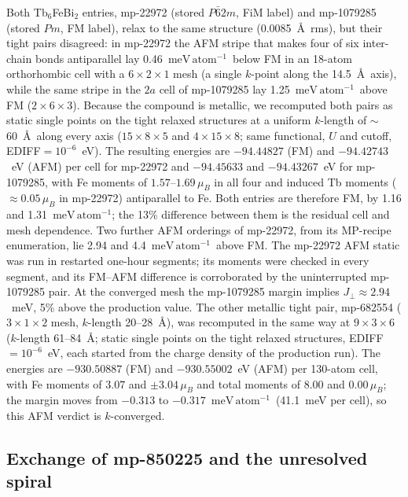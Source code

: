 \documentclass[aps,prb,preprint,superscriptaddress,longbibliography,nofootinbib]{revtex4-2}
\newcommand{\meVat}{\ensuremath{\mathrm{meV\,atom^{-1}}}}
\begin{document}
Both Tb$_6$FeBi$_2$ entries, mp-22972 (stored $P\bar{6}2m$, FiM label) and mp-1079285 (stored $Pm$, FM label),
relax to the same structure (0.0085~\AA\ rms), but their tight pairs disagreed: in mp-22972 the AFM stripe that
makes four of six inter-chain bonds antiparallel lay 0.46~\meVat\ below FM in an 18-atom orthorhombic cell with
a $6\times2\times1$ mesh (a single $k$-point along the 14.5~\AA\ axis), while the same stripe in the $2a$ cell of
mp-1079285 lay 1.25~\meVat\ above FM ($2\times6\times3$). Because the compound is metallic, we recomputed
both pairs as static single points on the tight relaxed structures at a uniform $k$-length of $\sim$60~\AA\
along every axis ($15\times8\times5$ and $4\times15\times8$; same functional, $U$ and cutoff,
EDIFF$=10^{-6}$~eV). The resulting energies are $-94.44827$ (FM) and $-94.42743$~eV (AFM) per cell for mp-22972 and
$-94.45633$ and $-94.43267$~eV for mp-1079285, with Fe moments of $1.57$--$1.69\,\mu_B$ in all four and induced
Tb moments ($\approx0.05\,\mu_B$ in mp-22972) antiparallel to Fe. Both entries are therefore FM, by 1.16 and
1.31~\meVat; the 13\% difference between them is the residual cell and mesh dependence. Two further AFM
orderings of mp-22972, from its MP-recipe enumeration, lie 2.94 and 4.4~\meVat\ above FM. The mp-22972 AFM
static was run in restarted one-hour segments; its moments were checked in every segment, and its FM--AFM
difference is corroborated by the uninterrupted mp-1079285 pair. At the converged mesh the mp-1079285 margin
implies $J_\perp\approx2.94$~meV, 5\% above the production value. The other metallic tight pair, mp-682554
($3\times1\times2$ mesh, $k$-length 20--28~\AA), was recomputed in the same way at $9\times3\times6$ ($k$-length
61--84~\AA; static single points on the tight relaxed structures, EDIFF$=10^{-6}$~eV, each started from the
charge density of the production run). The energies are $-930.50887$ (FM) and $-930.55002$~eV (AFM) per
130-atom cell, with Fe moments of $3.07$ and $\pm3.04\,\mu_B$ and total moments of 8.00 and $0.00\,\mu_B$; the
margin moves from $-0.313$ to $-0.317$~\meVat\ (41.1~meV per cell), so this AFM verdict is $k$-converged.

\subsection*{Exchange of mp-850225 and the unresolved spiral}
\end{document}
